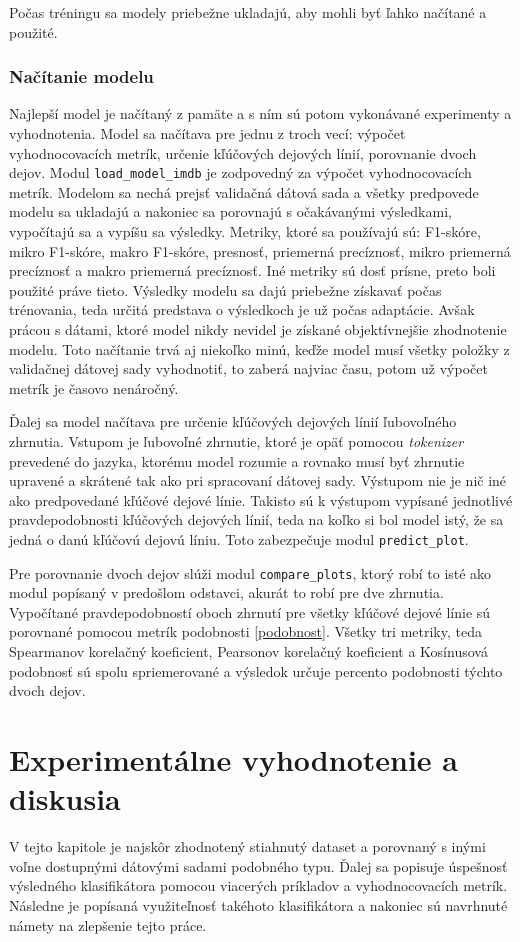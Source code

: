 Počas tréningu sa modely priebežne ukladajú, aby mohli byť ľahko načítané a použité.

\subsection*{Načítanie modelu}

Najlepší model je načítaný z pamäte a s ním sú potom vykonávané experimenty a vyhodnotenia. Model sa načítava pre jednu z troch vecí: výpočet vyhodnocovacích metrík, určenie kľúčových dejových línií, porovnanie dvoch dejov. Modul {\tt load\_model\_imdb} je zodpovedný za výpočet vyhodnocovacích metrík. Modelom sa nechá prejsť validačná dátová sada  a všetky predpovede modelu sa ukladajú a nakoniec sa porovnajú s očakávanými výsledkami, vypočítajú sa a vypíšu sa výsledky. Metriky, ktoré sa používajú sú: F1-skóre, mikro F1-skóre, makro F1-skóre, presnosť, priemerná precíznosť, mikro priemerná precíznosť a makro priemerná precíznosť. Iné metriky sú dosť prísne, preto boli použité práve tieto. Výsledky modelu sa dajú priebežne získavať počas trénovania, teda určitá predstava o výsledkoch je už počas adaptácie. Avšak prácou s dátami, ktoré model nikdy nevidel je získané objektívnejšie zhodnotenie modelu. Toto načítanie trvá aj niekoľko minú, keďže model musí všetky položky z validačnej dátovej sady vyhodnotiť, to zaberá najviac času, potom už výpočet metrík je časovo nenáročný. 

Ďalej sa model načítava pre určenie kľúčových dejových línií ľubovoľného zhrnutia. Vstupom je ľubovoľné zhrnutie, ktoré je opäť pomocou \textit{tokenizer} prevedené do jazyka, ktorému model rozumie a rovnako musí byť zhrnutie upravené a skrátené tak ako pri spracovaní dátovej sady. Výstupom nie je nič iné ako predpovedané kľúčové dejové línie. Takisto sú k výstupom vypísané jednotlivé pravdepodobnosti kľúčových dejových línií, teda na koľko si bol model istý, že sa jedná o danú kľúčovú dejovú líniu. Toto zabezpečuje modul {\tt predict\_plot}.

Pre porovnanie dvoch dejov slúži modul {\tt compare\_plots}, ktorý robí to isté ako modul popísaný v predošlom odstavci, akurát to robí pre dve zhrnutia. Vypočítané pravdepodobností oboch zhrnutí pre všetky kľúčové dejové línie sú porovnané pomocou metrík podobnosti \ref{podobnost}. Všetky tri metriky, teda Spearmanov korelačný koeficient, Pearsonov korelačný koeficient a Kosínusová podobnosť sú spolu spriemerované a výsledok určuje percento podobnosti týchto dvoch dejov.


\chapter{Experimentálne vyhodnotenie a diskusia}
\label{experimenty}
V tejto kapitole je najskôr zhodnotený stiahnutý dataset a porovnaný s inými voľne dostupnými dátovými sadami podobného typu. Ďalej sa popisuje úspešnosť výsledného klasifikátora pomocou viacerých príkladov a vyhodnocovacích metrík. Následne je popísaná využiteľnosť takéhoto klasifikátora a nakoniec sú navrhnuté námety na zlepšenie tejto práce. 


